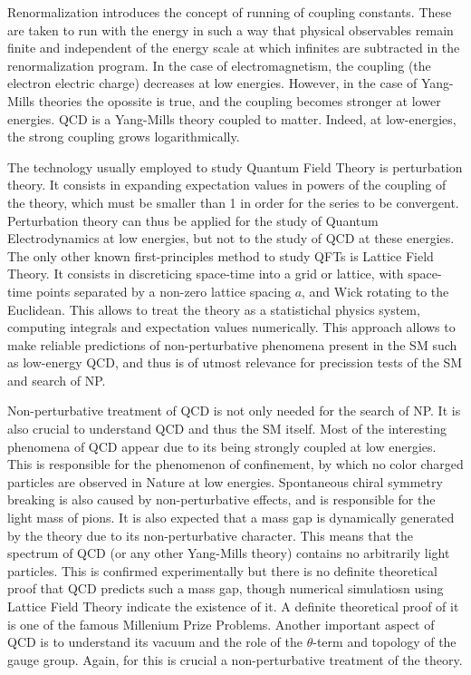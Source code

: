 Renormalization introduces the concept of running of coupling constants. These are taken to run with the energy in such a way that physical observables remain finite and independent of the energy scale at which infinites are subtracted in the renormalization program.  In the case of electromagnetism, the coupling (the electron electric charge) decreases at low energies. However, in the case of Yang-Mills theories the opossite is true, and the coupling becomes stronger at lower energies. QCD is a Yang-Mills theory coupled to matter. Indeed, at low-energies, the strong coupling grows logarithmically. 

The technology usually employed to study Quantum Field Theory is perturbation theory. It consists in expanding expectation values in powers of the coupling of the theory, which must be smaller than 1 in order for the series to be convergent. Perturbation theory can thus be applied for the study of Quantum Electrodynamics at low energies, but not to the study of QCD at these energies. The only other known first-principles method to study QFTs is Lattice Field Theory. It consists in discreticing space-time into a grid or lattice, with space-time points separated by a non-zero lattice spacing $a$, and Wick rotating to the Euclidean. This allows to treat the theory as a statistichal physics system, computing integrals and expectation values numerically. This approach allows to make reliable predictions of non-perturbative phenomena present in the SM such as low-energy QCD, and thus is of utmost relevance for precission tests of the SM and search of NP. 

Non-perturbative treatment of QCD is not only needed for the search of NP. It is also crucial to understand QCD and thus the SM itself. Most of the interesting phenomena of QCD appear due to its being strongly coupled at low energies. This is responsible for the phenomenon of confinement, by which no color charged particles are observed in Nature at low energies. Spontaneous chiral symmetry breaking is also caused by non-perturbative effects, and is responsible for the light mass of pions. It is also expected that a mass gap is dynamically generated by the theory due to its non-perturbative character. This means that the spectrum of QCD (or any other Yang-Mills theory) contains no arbitrarily light particles. This is confirmed experimentally but there is no definite theoretical proof that QCD predicts such a mass gap, though numerical simulatiosn using Lattice Field Theory indicate the existence of it. A definite theoretical proof of it is one of the famous Millenium Prize Problems. Another important aspect of QCD is to understand its vacuum and the role of the $\theta$-term and topology of the gauge group. Again, for this is crucial a non-perturbative treatment of the theory.

